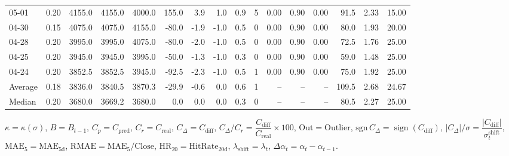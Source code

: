 \begin{threeparttable}
{\begin{tabular}{lrrrrrrrrrrrrrrr}
  05-01 &     0.20 & 4155.0 & 4155.0 & 4000.0 &      155.0 &            3.9 &                      1.0 &                 0.9 &              5 &       0.00 &      0.90 &           0.00 &             91.5 &            2.33 &                  15.00 \\
  04-30 &     0.15 & 4075.0 & 4075.0 & 4155.0 &      -80.0 &           -1.9 &                     -1.0 &                 0.5 &              0 &       0.00 &      0.90 &           0.00 &             80.0 &            1.93 &                  20.00 \\
  04-28 &     0.20 & 3995.0 & 3995.0 & 4075.0 &      -80.0 &           -2.0 &                     -1.0 &                 0.5 &              0 &       0.00 &      0.90 &           0.00 &             72.5 &            1.76 &                  25.00 \\
  04-25 &     0.20 & 3945.0 & 3945.0 & 3995.0 &      -50.0 &           -1.3 &                     -1.0 &                 0.3 &              0 &       0.00 &      0.90 &           0.00 &             59.0 &            1.48 &                  25.00 \\
  04-24 &     0.20 & 3852.5 & 3852.5 & 3945.0 &      -92.5 &           -2.3 &                     -1.0 &                 0.5 &              1 &       0.00 &      0.90 &           0.00 &             75.0 &            1.92 &                  25.00 \\
Average &     0.18 & 3836.0 & 3840.5 & 3870.3 &      -29.9 &           -0.6 &                      0.0 &                 0.6 &              1 &         -- &        -- &             -- &            109.5 &            2.68 &                  24.67 \\
 Median &     0.20 & 3680.0 & 3669.2 & 3680.0 &        0.0 &            0.0 &                      0.0 &                 0.3 &              0 &         -- &        -- &             -- &             80.5 &            2.27 &                  25.00 \\
\bottomrule
\end{tabular}
}
\begin{tablenotes}\footnotesize
\item $\kappa=\kappa(\sigma)$, $B=B_{t-1}$, $C_p=C_{\text{pred}}$, $C_r=C_{\text{real}}$, $C_\Delta=C_{\text{diff}}$, $C_\Delta/C_r=\dfrac{C_{\text{diff}}}{C_{\text{real}}}\times100$, $\mathrm{Out}=\text{Outlier}$, $\mathrm{sgn}\,C_\Delta=\operatorname{sign}(C_{\text{diff}})$, $|C_\Delta|/\sigma=\dfrac{|C_{\text{diff}}|}{\sigma_t^{\text{shift}}}$, $\mathrm{MAE}_5=\mathrm{MAE}_{5\text{d}}$, $\mathrm{RMAE}= \mathrm{MAE}_5 / \text{Close}$, $\mathrm{HR}_{20}=\mathrm{HitRate}_{20\text{d}}$, 
$\lambda_{\text{shift}}=\lambda_t$, 
$\Delta\alpha_t=\alpha_t-\alpha_{t-1}$.
\end{tablenotes}
\end{threeparttable}
\endgroup

